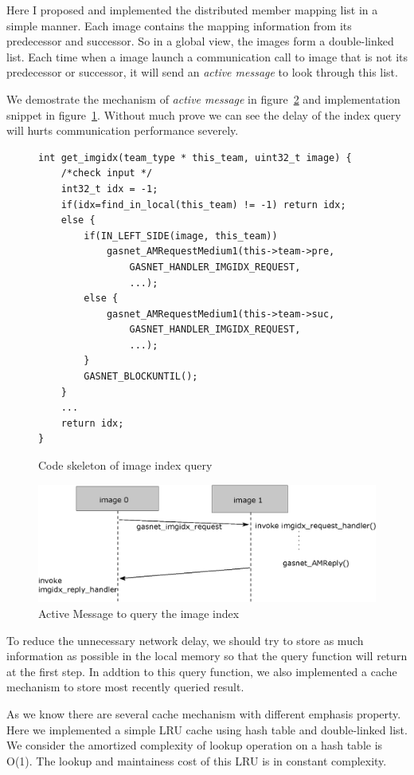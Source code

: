 Here I proposed and implemented the distributed member mapping list in a simple manner. Each image contains the mapping information from its predecessor and successor. So in a global view, the images form a double-linked list. Each time when a image launch a communication call to image that is not its predecessor or successor, it will send an \textit{active message} to look through this list. 

We demostrate the mechanism of \textit{active message} in figure~\ref{fig:am-imgidx} and implementation snippet in figure~\ref{fig:demo-imgidx}. Without much prove we can see the delay of the index query will hurts communication performance severely. 
\begin{figure}[h]
    \begin{minipage}{0.35\columnwidth}
    \begin{lstlisting}
int get_imgidx(team_type * this_team, uint32_t image) {
	/*check input */
	int32_t idx = -1;
	if(idx=find_in_local(this_team) != -1) return idx;
	else {
		if(IN_LEFT_SIDE(image, this_team)) 
			gasnet_AMRequestMedium1(this->team->pre, 
				GASNET_HANDLER_IMGIDX_REQUEST,
				...);
		else {
			gasnet_AMRequestMedium1(this->team->suc, 
				GASNET_HANDLER_IMGIDX_REQUEST,
				...);
		}	
		GASNET_BLOCKUNTIL();
	}
	...
	return idx;
}
\end{lstlisting}
\end{minipage}
\caption{Code skeleton of image index query}
\label{fig:demo-imgidx}
\end{figure}

\begin{figure}[H]
\centering
\includegraphics[scale=0.58]{figures/amdemo.eps}
\caption{Active Message to query the image index}
\label{fig:am-imgidx}
\end{figure}
To reduce the unnecessary network delay, we should try to store as much information as possible in the local memory so that the query function will return at the first step. In addtion to this query function, we also implemented a cache mechanism to store most recently queried result. 

As we know there are several cache mechanism with different emphasis property. Here we implemented a simple LRU cache using hash table and double-linked list. We consider the amortized complexity of lookup operation on a hash table is O(1). The lookup and maintainess cost of this LRU is in constant complexity. 

